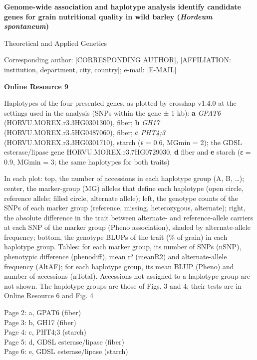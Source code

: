 \documentclass[10pt]{article}
\begin{document}
{\large\bfseries Genome-wide association and haplotype analysis identify candidate genes for grain nutritional quality in wild barley (\textit{Hordeum spontaneum})\par}\vspace{3mm}
Theoretical and Applied Genetics\par
[AUTHOR NAMES]\par
Corresponding author: [CORRESPONDING AUTHOR], [AFFILIATION: institution, department, city, country]; e-mail: [E-MAIL]\par\vspace{10mm}
{\large\bfseries Online Resource 9\par}\vspace{3mm}
Haplotypes of the four presented genes, as plotted by crosshap v1.4.0 at the settings used in the analysis (SNPs within the gene ± 1 kb): \textbf{a} \textit{GPAT6} (HORVU.MOREX.r3.3HG0301300), fiber; \textbf{b} \textit{GH17} (HORVU.MOREX.r3.5HG0487060), fiber; \textbf{c} \textit{PHT4;3} (HORVU.MOREX.r3.3HG0301710), starch (ε = 0.6, MGmin = 2); the GDSL esterase/lipase gene HORVU.MOREX.r3.7HG0729030, \textbf{d} fiber and \textbf{e} starch (ε = 0.9, MGmin = 3; the same haplotypes for both traits)

In each plot: top, the number of accessions in each haplotype group (A, B, …); center, the marker-group (MG) alleles that define each haplotype (open circle, reference allele; filled circle, alternate allele); left, the genotype counts of the SNPs of each marker group (reference, missing, heterozygous, alternate); right, the absolute difference in the trait between alternate- and reference-allele carriers at each SNP of the marker group (Pheno association), shaded by alternate-allele frequency; bottom, the genotype BLUPs of the trait (\% of grain) in each haplotype group. Tables: for each marker group, its number of SNPs (nSNP), phenotypic difference (phenodiff), mean r² (meanR2) and alternate-allele frequency (AltAF); for each haplotype group, its mean BLUP (Pheno) and number of accessions (nTotal). Accessions not assigned to a haplotype group are not shown. The haplotype groups are those of Figs. 3 and 4; their tests are in Online Resource 6 and Fig. 4\par\vspace{6mm}
{\small Page 2: a, GPAT6 (fiber)\\ Page 3: b, GH17 (fiber)\\ Page 4: c, PHT4;3 (starch)\\ Page 5: d, GDSL esterase/lipase (fiber)\\ Page 6: e, GDSL esterase/lipase (starch)}
\end{document}
